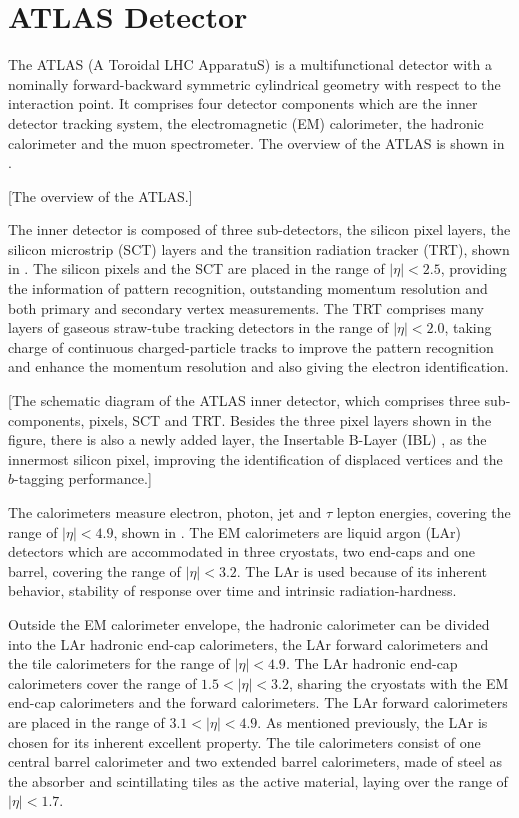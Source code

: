 \documentclass[class=NTHU_thesis, crop=false]{standalone}
\begin{document}
\chapter{ATLAS Detector}
\label{chap:ATLAS_Detector}
The ATLAS (A Toroidal LHC ApparatuS) \cite{1748-0221-3-08-S08003} is a multifunctional detector with a nominally forward-backward symmetric cylindrical geometry with respect to the interaction point. It comprises four detector components which are the inner detector tracking system, the electromagnetic (EM) calorimeter, the hadronic calorimeter and the muon spectrometer. The overview of the ATLAS is shown in .

[The overview of the ATLAS.]

The inner detector is composed of three sub-detectors, the silicon pixel layers, the silicon microstrip (SCT) layers and the transition radiation tracker (TRT), shown in . The silicon pixels and the SCT are placed in the range of $\left|\eta\right| < 2.5$, providing the information of pattern recognition, outstanding momentum resolution and both primary and secondary vertex measurements. The TRT comprises many layers of gaseous straw-tube tracking detectors in the range of $\left|\eta\right| < 2.0$, taking charge of continuous charged-particle tracks to improve the pattern recognition and enhance the momentum resolution and also giving the electron identification.

[The schematic diagram of the ATLAS inner detector, which comprises three sub-components, pixels, SCT and TRT. Besides the three pixel layers shown in the figure, there is also a newly added layer, the Insertable B-Layer (IBL) \cite{Capeans:1291633}, as the innermost silicon pixel, improving the identification of displaced vertices and the $b$-tagging performance.]

The calorimeters measure electron, photon, jet and $\tau$ lepton energies, covering the range of $\left|\eta\right| < 4.9$, shown in . The EM calorimeters are liquid argon (LAr) detectors which are accommodated in three cryostats, two end-caps and one barrel, covering the range of $\left|\eta\right| < 3.2$. The LAr is used because of its inherent behavior, stability of response over time and intrinsic radiation-hardness.

Outside the EM calorimeter envelope, the hadronic calorimeter can be divided into the LAr hadronic end-cap calorimeters, the LAr forward calorimeters and the tile calorimeters for the range of $\left|\eta\right| < 4.9$. The LAr hadronic end-cap calorimeters cover the range of $1.5 < \left|\eta\right| < 3.2$, sharing the cryostats with the EM end-cap calorimeters and the forward calorimeters. The LAr forward calorimeters are placed in the range of $3.1 < \left|\eta\right| < 4.9$. As mentioned previously, the LAr is chosen for its inherent excellent property. The tile calorimeters consist of one central barrel calorimeter and two extended barrel calorimeters, made of steel as the absorber and scintillating tiles as the active material, laying over the range of $\left|\eta\right| < 1.7$.
\end{document}
